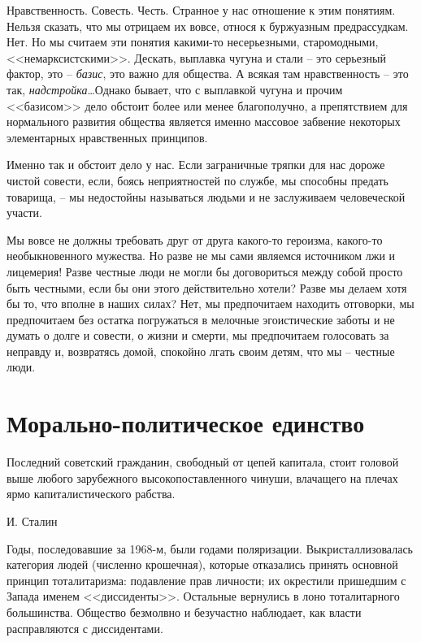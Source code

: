 \documentclass{book}
\begin{document}
Нравственность. Совесть. Честь. Странное у нас отношение к этим понятиям. Нельзя сказать, что мы отрицаем их вовсе, относя к буржуазным предрассудкам. Нет. Но мы считаем эти понятия какими-то несерьезными, старомодными, <<немарксистскими>>. Дескать, выплавка чугуна и стали -- это серьезный фактор, это -- \textit{базис},  это важно для общества. А всякая там нравственность -- это так, \textit{надстройка}\ldots  Однако бывает, что с выплавкой чугуна и прочим <<базисом>> дело обстоит более или менее благополучно, а препятствием для нормального развития общества является именно массовое забвение некоторых элементарных нравственных принципов.

Именно так и обстоит дело у нас. Если заграничные тряп­ки для нас дороже чистой совести, если, боясь неприятностей по службе, мы способны предать товарища, -- мы недостойны называться людьми и не заслуживаем человеческой участи.

Мы вовсе не должны требовать друг от друга какого-то героизма, какого-то необыкновенного мужества. Но разве не мы сами являемся источником лжи и лицемерия! Разве честные люди не могли бы договориться между собой просто быть честными, если бы они этого действительно хотели? Разве мы делаем хотя бы то, что вполне в наших силах? Нет, мы предпочитаем находить отговорки, мы предпочитаем без остатка погружаться в мелочные эгоистические заботы и не думать о долге и совести, о жизни и смерти, мы предпочитаем голосовать за неправду и, возвратясь домой, спокойно лгать своим детям, что мы -- честные люди.


\section{Морально-политическое единство}

\epigraph{Последний советский гражданин, свободный от цепей капитала, стоит головой выше любого зарубежного высокопоставленного чинуши, влачащего на плечах ярмо капиталистического рабства.}{И. Сталин%
}


Годы, последовавшие за 1968-м, были годами поляризации. Выкристаллизовалась категория людей (численно крошечная), которые отказались принять основной принцип тотали\-тариз­ма: подавление прав личности; их окрестили пришедшим с Запада именем <<диссиденты>>. Остальные вернулись в лоно тоталитарного большинства. Общество безмолвно и безучаст­но наблюдает, как власти расправляются с диссидентами.
\end{document}
